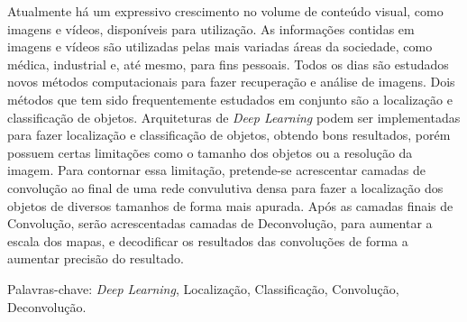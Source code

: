 \begin{resumo}
\vspace{-1cm}

\onehalfspacing

\noindent 
   Atualmente há um expressivo crescimento no volume de conteúdo visual, como imagens e vídeos, disponíveis para utilização. As informações contidas em imagens e vídeos são utilizadas pelas mais variadas áreas da sociedade, como médica, industrial e, até mesmo, para fins pessoais. Todos os dias são estudados novos métodos computacionais para fazer recuperação e análise de imagens. Dois métodos que tem sido frequentemente estudados em conjunto são a localização e classificação de objetos. Arquiteturas de \textit{Deep Learning} podem ser implementadas para fazer localização e classificação de objetos, obtendo bons resultados, porém possuem certas limitações como o tamanho dos objetos ou a resolução da imagem. Para contornar essa limitação, pretende-se acrescentar camadas de convolução ao final de uma rede convulutiva densa para fazer a localização dos objetos de diversos tamanhos de forma mais apurada. Após as camadas finais de Convolução, serão acrescentadas camadas de Deconvolução, para aumentar a escala dos mapas, e decodificar os resultados das convoluções de forma a aumentar  precisão do resultado.

\vspace*{.75cm}

\noindent Palavras-chave: \textit{Deep Learning}, Localização, Classificação, Convolução, Deconvolução.\\

\end{resumo}